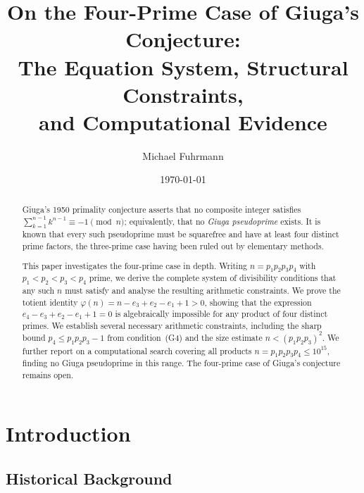 \documentclass[12pt,a4paper]{amsart}
\theoremstyle{definition}
\begin{document}

\title{On the Four-Prime Case of Giuga's Conjecture:\\
       The Equation System, Structural Constraints,\\
       and Computational Evidence}

\author{Michael Fuhrmann}
\address{Specialist Mathematics Project, Build 133}
\date{\today}

\begin{abstract}
Giuga's 1950 primality conjecture asserts that no composite integer satisfies
$\sum_{k=1}^{n-1} k^{n-1} \equiv -1 \pmod{n}$; equivalently, that no
\emph{Giuga pseudoprime} exists.  It is known that every such pseudoprime must
be squarefree and have at least four distinct prime factors, the three-prime
case having been ruled out by elementary methods.

This paper investigates the four-prime case in depth.  Writing
$n = p_1 p_2 p_3 p_4$ with $p_1 < p_2 < p_3 < p_4$ prime, we derive the
complete system of divisibility conditions that any such $n$ must satisfy
and analyse the resulting arithmetic constraints.  We prove the totient
identity $\varphi(n) = n - e_3 + e_2 - e_1 + 1 > 0$, showing that the
expression $e_4 - e_3 + e_2 - e_1 + 1 = 0$ is algebraically impossible
for any product of four distinct primes.  We establish several necessary
arithmetic constraints, including the sharp bound $p_4 \le p_1 p_2 p_3 - 1$
from condition~(G4) and the size estimate $n < (p_1 p_2 p_3)^2$.  We further
report on a computational search covering all products $n = p_1 p_2 p_3 p_4
\le 10^{15}$, finding no Giuga pseudoprime in this range.  The four-prime
case of Giuga's conjecture remains open.
\end{abstract}

\maketitle
\tableofcontents

\section{Introduction}
\label{sec:intro}

\subsection{Historical Background}
\end{document}
